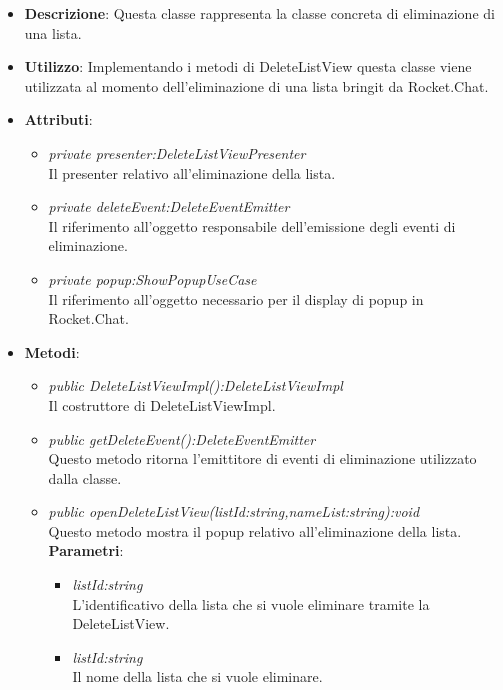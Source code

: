 \begin{itemize}
\item \textbf{Descrizione}: Questa classe rappresenta la classe concreta di eliminazione di una lista.
\item \textbf{Utilizzo}: Implementando i metodi di DeleteListView questa classe viene utilizzata al momento dell'eliminazione di una lista bringit da Rocket.Chat.
\item \textbf{Attributi}: 
\begin{itemize}
	\item \textit{private presenter:DeleteListViewPresenter}\\
	Il presenter relativo all'eliminazione della lista.
	\item \textit{private deleteEvent:DeleteEventEmitter}\\
	Il riferimento all'oggetto responsabile dell'emissione degli eventi di eliminazione.
	\item \textit{private popup:ShowPopupUseCase}\\
	Il riferimento all'oggetto necessario per il display di popup in Rocket.Chat.
\end{itemize}
\item \textbf{Metodi}:
	\begin{itemize}
	\item \textit{public DeleteListViewImpl():DeleteListViewImpl}\\
	Il costruttore di DeleteListViewImpl.
	\item \textit{public getDeleteEvent():DeleteEventEmitter}\\
	Questo metodo ritorna l'emittitore di eventi di eliminazione utilizzato dalla classe.
	\item \textit{public openDeleteListView(listId:string,nameList:string):void}\\
	Questo metodo mostra il popup relativo all'eliminazione della lista.
					\\ \textbf{Parametri}: \begin{itemize}
			\item \textit{listId:string}\\
			L'identificativo della lista che si vuole eliminare tramite la DeleteListView.
			\item \textit{listId:string}\\
			Il nome della lista che si vuole eliminare.
					\end{itemize} 
	\end{itemize}
\end{itemize} 

